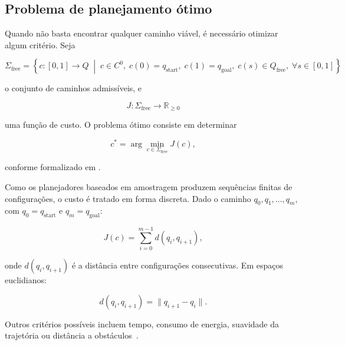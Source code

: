 \subsection*{Problema de planejamento ótimo}

Quando não basta encontrar qualquer caminho viável, é necessário otimizar algum critério. Seja

\begin{equation}
    \Sigma_{\mathrm{free}} =
    \left\{
        c : [0,1] \rightarrow Q \;\middle|\;
        c \in C^0,\;
        c(0) = q_{\mathrm{start}},\;
        c(1) = q_{\mathrm{goal}},\;
        c(s) \in Q_{\mathrm{free}},\; \forall s \in [0,1]
    \right\}
    \label{eq:admissible_paths}
\end{equation}

o conjunto de caminhos admissíveis, e

\begin{equation}
    J : \Sigma_{\mathrm{free}} \rightarrow \mathbb{R}_{\geq 0}
    \label{eq:functional_cost}
\end{equation}

uma função de custo. O problema ótimo consiste em determinar

\begin{equation}
    c^* = \arg\min_{c \in \Sigma_{\mathrm{free}}} J(c),
    \label{eq:optimal_planning_problem}
\end{equation}

conforme formalizado em \cite{Karaman2011SamplingbasedAF}.

Como os planejadores baseados em amostragem produzem sequências finitas de configurações, o custo é tratado em forma discreta. Dado o caminho $q_0, q_1, \ldots, q_m$, com $q_0 = q_{\mathrm{start}}$ e $q_m = q_{\mathrm{goal}}$:

\begin{equation}
    J(c) =
    \sum_{i=0}^{m-1}
    d(q_i, q_{i+1}),
    \label{eq:discrete_path_cost}
\end{equation}

onde $d(q_i, q_{i+1})$ é a distância entre configurações consecutivas. Em espaços euclidianos:

\begin{equation}
    d(q_i, q_{i+1}) =
    \| q_{i+1} - q_i \|.
    \label{eq:euclidean_distance}
\end{equation}

Outros critérios possíveis incluem tempo, consumo de energia, suavidade da trajetória ou distância a obstáculos~\cite{choset2005principles}.

